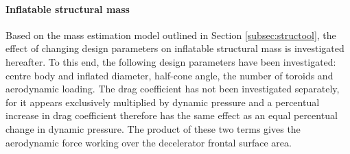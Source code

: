 \paragraph{Inflatable structural mass}

Based on the mass estimation model outlined in Section \ref{subsec:structool}, the effect of changing design parameters on inflatable structural mass is investigated hereafter. To this end, the following design parameters have been investigated: centre body and inflated diameter, half-cone angle, the number of toroids and aerodynamic loading. The drag coefficient has not been investigated separately, for it appears exclusively multiplied by dynamic pressure and a percentual increase in drag coefficient therefore has the same effect as an equal percentual change in dynamic pressure. The product of these two terms gives the aerodynamic force working over the decelerator frontal surface area.

